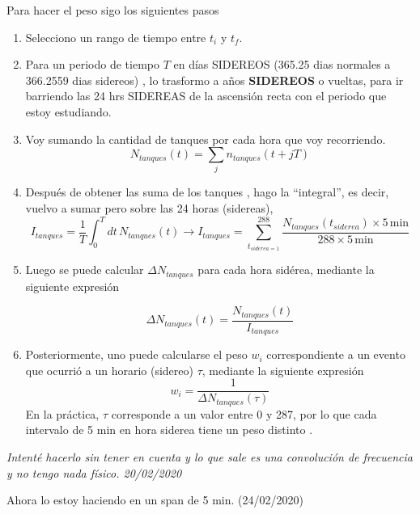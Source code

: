 	Para hacer el peso sigo los siguientes pasos
	\begin{enumerate}
		\item Selecciono un rango de tiempo entre $t_i$ y $t_f$.
		\item Para un periodo de tiempo $T$ en días SIDEREOS (365.25 dias normales a 366.2559 dias sidereos) , lo trasformo a  años {\bf SIDEREOS}  o vueltas, para ir barriendo las 24 hrs SIDEREAS de la ascensión recta con el periodo que estoy estudiando.
		\item Voy sumando la cantidad de tanques por cada hora que voy recorriendo. 
		\begin{equation}
			N_{tanques}(t) = \sum_j n_{tanques}(t + jT)
		\end{equation}
		\item Después de obtener las suma de los tanques , hago la ``integral'', es decir, vuelvo a sumar pero sobre las 24 horas (sidereas),  
		\begin{equation}
			I_{tanques} = \frac{1}{T} \int_{0}^{T} dt \, N_{tanques}(t) \rightarrow I_{tanques} = \sum^{288}_{t_{siderea=1}}\frac{ N_{tanques}(t_{siderea})\times5\, \text{min}}{288 \times 5\, \text{min}}
		\end{equation}
	
		\item Luego se puede calcular $\Delta N_{tanques}$ para cada hora sidérea, mediante la siguiente expresión
	
		\begin{equation}
			\Delta N_{tanques}(t) = \frac{N_{tanques}(t)}{I_{tanques}}
		\end{equation}
	
		\item Posteriormente, uno puede calcularse el peso  $w_i$ correspondiente a un evento que ocurrió a un horario (sidereo) $\tau$, mediante la siguiente expresión
		\begin{equation}
			w_i = \frac{1}{\Delta N_{tanques}(\tau)} 
		\end{equation}
		En la práctica, $\tau$ corresponde a un valor entre 0 y 287, por lo que cada intervalo de 5 min  en hora siderea tiene un peso distinto .
	
	\end{enumerate}
	
	\emph{Intenté hacerlo sin tener en cuenta y lo que sale es una convolución de frecuencia y no tengo nada físico. 20/02/2020}

	Ahora lo estoy haciendo en un span de 5 min. (24/02/2020)

